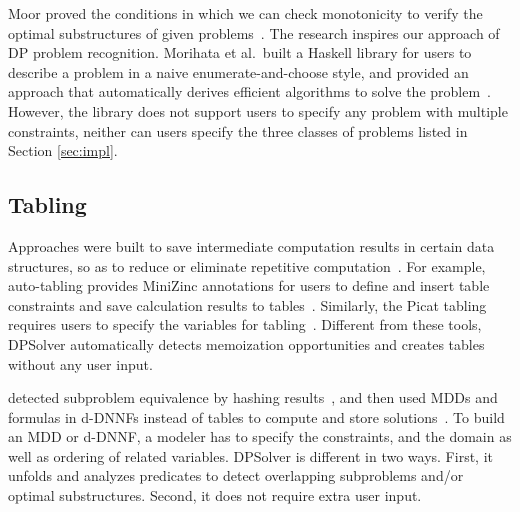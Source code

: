 Moor proved the conditions in which we can check monotonicity to verify the optimal substructures of given problems~\cite{Moor1994Categories}. The research inspires our approach of DP problem recognition.
Morihata et al.~built a Haskell library for users to describe a problem in a naive enumerate-and-choose style, and provided an approach that automatically derives efficient algorithms to solve the problem~\cite{Morihata2014Dynamic}. However, the library does not support users to specify any problem with multiple constraints, neither can users specify the three classes of problems listed in Section \ref{sec:impl}.




\subsection{Tabling}
\label{sec:table_related}

Approaches were built to save intermediate computation results in certain data structures, so as to reduce or eliminate repetitive computation~\cite{zhou2015constraint,dekker2017auto,de2019compiling}. For example, 
auto-tabling provides MiniZinc annotations for users to define and insert table constraints and save calculation results to tables~\cite{dekker2017auto}.
Similarly, the Picat tabling requires users to specify the variables for tabling~\cite{zhou2015constraint}. Different from these tools, DPSolver automatically detects memoization opportunities and creates tables without any user input.

\citeauthor{de2019compiling} detected subproblem equivalence by hashing results~\cite{chu2012exploiting}, and then used MDDs and formulas in d-DNNFs instead of tables to compute and store solutions~\cite{de2019compiling}. To build an MDD or d-DNNF, a modeler has to specify the constraints, and the domain as well as ordering of related variables. DPSolver is different in two ways. First, it unfolds and analyzes predicates to detect overlapping subproblems and/or optimal substructures. Second, it does not require extra user input.